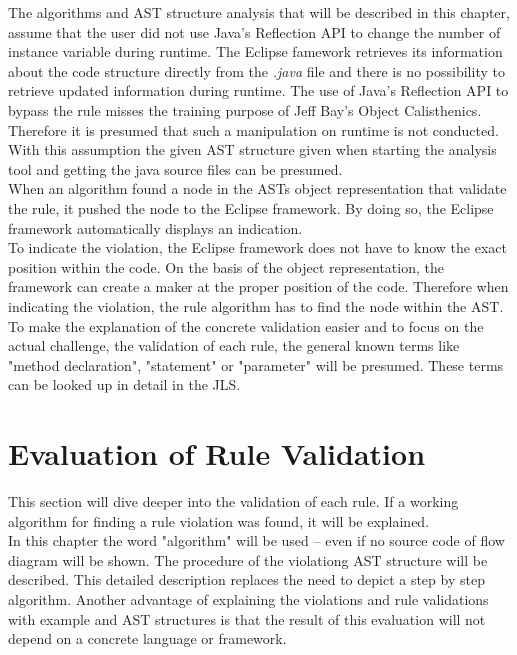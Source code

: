 The algorithms and \acf{AST} structure analysis that will be described in this chapter, assume that the user did not use Java's Reflection \acf{API} to change the number of instance variable during runtime. The Eclipse famework retrieves its information about the code structure directly from the \textit{.java} file and there is no possibility to retrieve updated information during runtime. The use of Java's Reflection \acf{API} to bypass the rule misses the training purpose of Jeff Bay's Object Calisthenics.  Therefore it is presumed that such a manipulation on runtime is not conducted. With this assumption the given \acf{AST} structure given when starting the analysis tool and getting the java source files can be presumed.
\\

When an algorithm found a node in the \acf{AST}s object representation that validate the rule, it pushed the node to the Eclipse framework. By doing so, the Eclipse framework automatically displays an indication. 
\\

To indicate the violation, the Eclipse framework does not have to know the exact position within the code. On the basis of the object representation, the framework can create a maker at the proper position of the code. Therefore when indicating the violation, the rule algorithm has to find the node within the \acf{AST}.
\\

To make the explanation of the concrete validation easier and to focus on the actual challenge, the validation of each rule, the general known terms like "method declaration", "statement" or "parameter" will be presumed. These terms can be looked up in detail in the \acf{JLS}\cite{jls}. 

\section{Evaluation of Rule Validation}
\label{e:evaluation}
This section will dive deeper into the validation of each rule. If a working algorithm for finding a rule violation was found, it will be explained.
\\

In this chapter the word "algorithm" will be used -- even if no source code of flow diagram will be shown. The procedure of the violationg \acf{AST}  structure will be described. This detailed description replaces the need to depict a step by step algorithm. Another advantage of explaining the violations and rule validations with example and \acf{AST} structures is that the result of this evaluation will not depend on a concrete language or framework. 
\\

